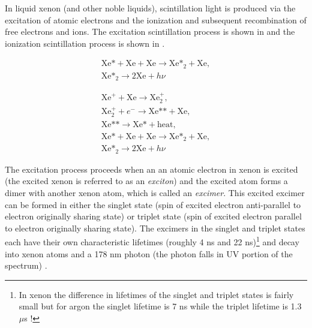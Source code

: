 In liquid xenon (and other noble liquids), scintillation light is produced via the excitation of atomic electrons and the ionization and subsequent recombination of free electrons and ions.  The excitation scintillation process is shown in  and the ionization scintillation process is shown in .  



\begin{equation}
        \label{eqn:exciton_production}
        \begin{gathered}
                \textrm{Xe*} + \textrm{Xe} + \textrm{Xe} \rightarrow \textrm{Xe*}_2 + \textrm{Xe}, \\
                \textrm{Xe*}_2 \rightarrow 2\textrm{Xe} + h \nu
        \end{gathered}
\end{equation}


\begin{equation}
        \label{eqn:ionization_production}
        \begin{gathered}
                \textrm{Xe}^+ + \textrm{Xe} \rightarrow \textrm{Xe}_2^+, \\
                \textrm{Xe}_2^+ + e^- \rightarrow \textrm{Xe**} + \textrm{Xe}, \\
                \textrm{Xe**} \rightarrow \textrm{Xe*} + \textrm{heat}, \\
                \textrm{Xe*} + \textrm{Xe} + \textrm{Xe} \rightarrow \textrm{Xe*}_2 + \textrm{Xe}, \\
                \textrm{Xe*}_2 \rightarrow 2\textrm{Xe} + h \nu
        \end{gathered}
\end{equation}

The excitation process proceeds when an an atomic electron in xenon is excited (the excited xenon is referred to as an \textit{exciton}) and the excited atom forms a dimer with another xenon atom, which is called an \textit{excimer}.  This excited excimer can be formed in either the singlet state (spin of excited electron anti-parallel to electron originally sharing state) or triplet state (spin of excited electron parallel to electron originally sharing state).  The excimers in the singlet and triplet states each have their own characteristic lifetimes (roughly 4 ns and 22 ns)\footnote{In xenon the difference in lifetimes of the singlet and triplet states is fairly small but for argon the singlet lifetime is 7 ns while the triplet lifetime is 1.3 $\mu$s \cite{heindl2011table}!} and decay into xenon atoms and a 178 nm photon (the photon falls in UV portion of the spectrum) \cite{hitachi1983effect, doke2002absolute}.  

